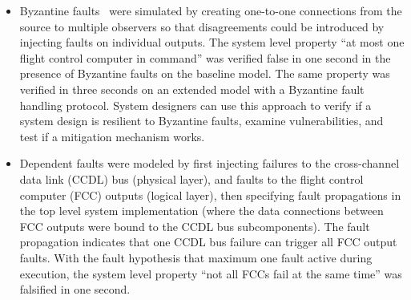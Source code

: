 \begin{itemize}
	\item Byzantine faults~\cite{Driscoll-Byzantine-Fault} were simulated by creating one-to-one connections from the source to multiple observers so that disagreements could be introduced by injecting faults on individual outputs. The system level property ``at most one flight control computer in command'' was verified false in one second in the presence of Byzantine faults on the baseline model. The same property was verified in three seconds on an extended model with a Byzantine fault handling protocol.  System designers can use this approach to verify if a system design is resilient to Byzantine faults, examine vulnerabilities, and test if a mitigation mechanism works.

	
	\item Dependent faults were modeled by first injecting failures to the cross-channel data link (CCDL) bus (physical layer), and faults to the flight control computer (FCC) outputs (logical layer), then specifying fault propagations in the top level system implementation (where the data connections between FCC outputs were bound to the CCDL bus subcomponents). The fault propagation indicates that one CCDL bus failure can trigger all FCC output faults. With the fault hypothesis that maximum one fault active during execution, the system level property ``not all FCCs fail at the same time'' was falsified in one second.
	
\end{itemize}


